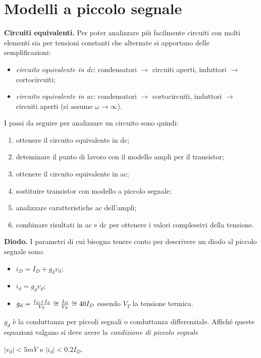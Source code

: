 \documentclass[a4paper,portrait,12pt]{article}
\theoremstyle{definition}
\begin{document}
\section{Modelli a piccolo segnale}

\textbf{Circuiti equivalenti.} Per poter analizzare più facilmente circuiti con molti elementi sia per 
tensioni constanti che alternate si apportano delle semplificazioni:
\begin{itemize}
\item \textit{circuito equivalente in dc}: condensatori $\to$ circuiti aperti, induttori $\to$ cortocircuiti;
\item \textit{circuito equivalente in ac}: condensatori $\to$ cortocircuiti, induttori $\to$ circuiti aperti 
	(si assume $\omega \to \infty$).
\end{itemize}
I passi da seguire per analizzare un circuito sono quindi:
\begin{enumerate}
\item ottenere il circuito equivalente in dc;
\item deteminare il punto di lavoro con il modello ampli per il transistor;
\item ottenere il circuito equivalente in ac;
\item sostituire transistor con modello a piccolo segnale;
\item analizzare caratteristiche ac dell'ampli;
\item combinare risultati in ac e dc per ottenere i valori complessivi della tensione.
\end{enumerate}
\bigskip

\textbf{Diodo.} I parametri di cui bisogna tenere conto per descrivere un diodo al piccolo segnale sono:
\begin{itemize}
\item $i_D = I_D + g_d v_d$;
\item $i_d = g_d v_d$;
\item $g_d = {I_D + I_S \over V_T} \cong {I_D \over V_T} \cong 40 I_D$ essendo $V_T$ la tensione termica.
\end{itemize}
$g_d$ è la conduttanza per piccoli segnali o conduttanza differenziale. Affiché queste equazioni valgano 
si deve avere la \textit{condizione di piccolo segnale}
\begin{center}
$\left|v_d\right| < 5 mV$ \quad e \quad $\left|i_d\right| < 0.2 I_D$.
\end{center}
\bigskip
\end{document}
